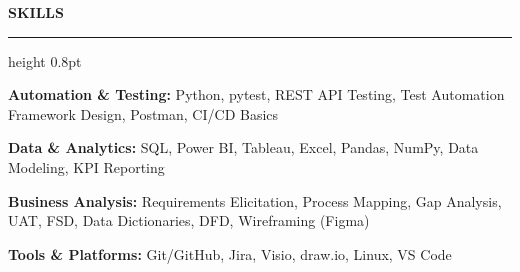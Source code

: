 \documentclass[11pt,letterpaper]{article}
\renewcommand{\section}[1]{
  \vspace{6pt}
  {\bfseries\large #1}
  \vspace{2pt}
  \hrule height 0.8pt
  \vspace{4pt}
}
\begin{document}
\vspace{2pt}

\section{SKILLS}

\textbf{Automation \& Testing:} \quad Python, pytest, REST API Testing, Test Automation Framework Design, Postman, CI/CD Basics

\vspace{1pt}

\textbf{Data \& Analytics:} \quad SQL, Power BI, Tableau, Excel, Pandas, NumPy, Data Modeling, KPI Reporting

\vspace{1pt}

\textbf{Business Analysis:} \quad Requirements Elicitation, Process Mapping, Gap Analysis, UAT, FSD, Data Dictionaries, DFD, Wireframing (Figma)

\vspace{1pt}

\textbf{Tools \& Platforms:} \quad Git/GitHub, Jira, Visio, draw.io, Linux, VS Code

\vspace{2pt}

\end{document}
